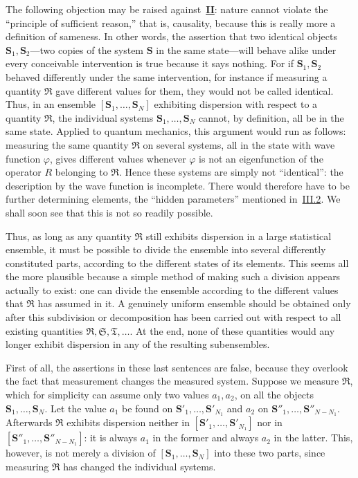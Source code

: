 \documentclass[fontsize=13pt,twoside,openany,headings=normal,parskip=false,bookmarkpackage=false,DIV=calc]{scrbook}
\begin{document}
The following objection may be raised against~\hyperref[case:IV.1.II]{\textbf{II}}: nature cannot violate the ``principle of sufficient reason,'' that is, causality, because this is really more a definition of sameness. In other words, the assertion that two identical objects $\boldsymbol{S}_1,\boldsymbol{S}_2$---two copies of the system $\boldsymbol{S}$ in the same state---will behave alike under every conceivable intervention is true because it says nothing. For if $\boldsymbol{S}_1,\boldsymbol{S}_2$ behaved differently under the same intervention, for instance if measuring a quantity $\mathfrak R$ gave different values for them, they would not be called identical. Thus, in an ensemble $[\boldsymbol{S}_1,\ldots,\boldsymbol{S}_N]$ exhibiting dispersion with respect to a quantity $\mathfrak R$, the individual systems $\boldsymbol{S}_1,\ldots,\boldsymbol{S}_N$ cannot, by definition, all be in the same state. Applied to quantum mechanics, this argument would run as follows: measuring the same quantity $\mathfrak R$ on several systems, all in the state with wave function $\varphi$, gives different
\hypertarget{origpage-161}{}%
values whenever $\varphi$ is not an eigenfunction of the operator $R$ belonging to $\mathfrak R$. Hence these systems are simply not ``identical'': the description by the wave function is incomplete. There would therefore have to be further determining elements, the ``hidden parameters'' mentioned in~\hyperref[sec:III.2]{III.2}. We shall soon see that this is not so readily possible.

Thus, as long as any quantity $\mathfrak R$ still exhibits dispersion in a large statistical ensemble, it must be possible to divide the ensemble into several differently constituted parts, according to the different states of its elements. This seems all the more plausible because a simple method of making such a division appears actually to exist: one can divide the ensemble according to the different values that $\mathfrak R$ has assumed in it. A genuinely uniform ensemble should be obtained only after this subdivision or decomposition has been carried out with respect to all existing quantities $\mathfrak R,\mathfrak S,\mathfrak T,\ldots$. At the end, none of these quantities would any longer exhibit dispersion in any of the resulting subensembles.

First of all, the assertions in these last sentences are false, because they overlook the fact that measurement changes the measured system. Suppose we measure $\mathfrak R$, which for simplicity can assume only two values $a_1,a_2$, on all the objects $\boldsymbol{S}_1,\ldots,\boldsymbol{S}_N$. Let the value $a_1$ be found on $\boldsymbol{S}'_1,\ldots,\boldsymbol{S}'_{N_1}$ and $a_2$ on $\boldsymbol{S}''_1,\ldots,\boldsymbol{S}''_{N-N_1}$. Afterwards $\mathfrak R$ exhibits dispersion neither in $[\boldsymbol{S}'_1,\ldots,\boldsymbol{S}'_{N_1}]$ nor in $[\boldsymbol{S}''_1,\ldots,\boldsymbol{S}''_{N-N_1}]$: it is always $a_1$ in the former and always $a_2$ in the latter. This, however, is not merely a division of $[\boldsymbol{S}_1,\ldots,\boldsymbol{S}_N]$ into these two parts, since measuring $\mathfrak R$ has changed the individual systems.
\end{document}
